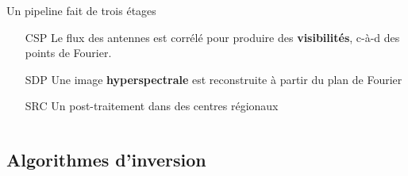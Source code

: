 \documentclass[usenames,dvipsnames]{beamer}
\begin{document}
{{\begin{columns}[t]
\begin{column}{.6\linewidth}
            \begin{block}{Un pipeline fait de trois étages}
            \begin{itemize}
                \item[CSP] Le flux des antennes est corrélé pour produire des \textbf{visibilités}, c-à-d des points de Fourier.
                \item[SDP] Une image \textbf{hyperspectrale} est reconstruite à partir du plan de Fourier
                \item[SRC] Un post-traitement dans des centres régionaux
                \end{itemize}
    \end{block}
   
\end{column}
\end{columns}
}
}


\subsection{Algorithmes d'inversion}
\end{document}
